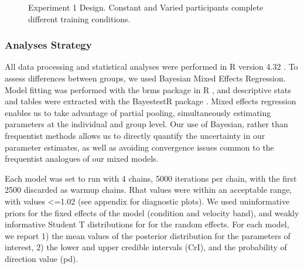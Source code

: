 \documentclass[
  12pt,
  letterpaper,
]{article}
\begin{document}
\begin{figure}


\caption{\label{fig-design-e1}Experiment 1 Design. Constant and Varied
participants complete different training conditions.}

\end{figure}%

\subsubsection{Analyses Strategy}\label{analyses-strategy}

All data processing and statistical analyses were performed in R version
4.32 \textcite{rcoreteamLanguageEnvironmentStatistical2020}. To assess
differences between groups, we used Bayesian Mixed Effects Regression.
Model fitting was performed with the brms package in R
\textcite{burknerBrmsPackageBayesian2017}, and descriptive stats and
tables were extracted with the BayestestR package
\textcite{makowskiBayestestRDescribingEffects2019}. Mixed effects
regression enables us to take advantage of partial pooling,
simultaneously estimating parameters at the individual and group level.
Our use of Bayesian, rather than frequentist methods allows us to
directly quantify the uncertainty in our parameter estimates, as well as
avoiding convergence issues common to the frequentist analogues of our
mixed models.

Each model was set to run with 4 chains, 5000 iterations per chain, with
the first 2500 discarded as warmup chains. Rhat values were within an
acceptable range, with values \textless=1.02 (see appendix for
diagnostic plots). We used uninformative priors for the fixed effects of
the model (condition and velocity band), and weakly informative Student
T distributions for for the random effects. For each model, we report 1)
the mean values of the posterior distribution for the parameters of
interest, 2) the lower and upper credible intervals (CrI), and the
probability of direction value (pd).
\end{document}
